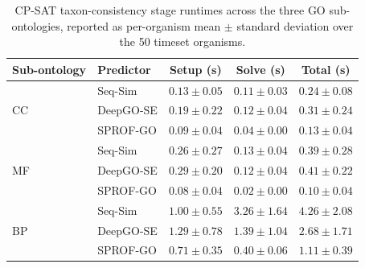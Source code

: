 \begin{table}[!h]
\centering
\caption{CP-SAT taxon-consistency stage runtimes across the three GO sub-ontologies, reported as per-organism mean $\pm$ standard deviation over the 50 timeset organisms.}
\label{tab:solver-runtime-taxon}
\small
\setlength{\tabcolsep}{4pt}
\begin{tabular}{llccc}
\toprule
Sub-ontology & Predictor & Setup (s) & Solve (s) & Total (s) \\
\midrule
\multirow{3}{*}{CC}
 & Seq-Sim   & $0.13 \pm 0.05$ & $0.11 \pm 0.03$ & $0.24 \pm 0.08$ \\
 & DeepGO-SE & $0.19 \pm 0.22$ & $0.12 \pm 0.04$ & $0.31 \pm 0.24$ \\
 & SPROF-GO  & $0.09 \pm 0.04$ & $0.04 \pm 0.00$ & $0.13 \pm 0.04$ \\
\midrule
\multirow{3}{*}{MF}
 & Seq-Sim   & $0.26 \pm 0.27$ & $0.13 \pm 0.04$ & $0.39 \pm 0.28$ \\
 & DeepGO-SE & $0.29 \pm 0.20$ & $0.12 \pm 0.04$ & $0.41 \pm 0.22$ \\
 & SPROF-GO  & $0.08 \pm 0.04$ & $0.02 \pm 0.00$ & $0.10 \pm 0.04$ \\
\midrule
\multirow{3}{*}{BP}
 & Seq-Sim   & $1.00 \pm 0.55$ & $3.26 \pm 1.64$ & $4.26 \pm 2.08$ \\
 & DeepGO-SE & $1.29 \pm 0.78$ & $1.39 \pm 1.04$ & $2.68 \pm 1.71$ \\
 & SPROF-GO  & $0.71 \pm 0.35$ & $0.40 \pm 0.06$ & $1.11 \pm 0.39$ \\
\bottomrule
\end{tabular}
\end{table}
